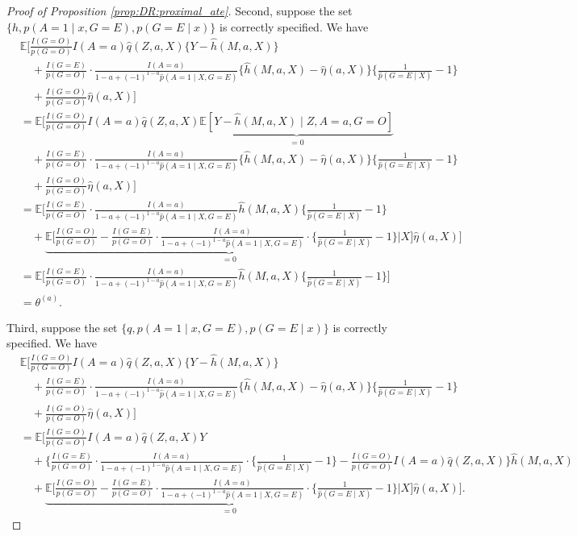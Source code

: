 \documentclass[10pt]{article}
\newcommand{\E}{\mathbb{E}}
\begin{document}
\begin{proof}[Proof of Proposition \ref{prop:DR:proximal_ate}]
Second, suppose the set $\{h,p(A=1\mid x,G=E),p(G=E\mid x)\}$ is correctly specified. We have
\begingroup
\allowdisplaybreaks
{\footnotesize \begin{align*}
&\E\Big[\frac{I(G=O)}{p(G=O)}I(A=a)\hat{q}(Z,a,X)\{Y-\hat{h}(M,a,X)\}\\
&\quad+\frac{I(G=E)}{p(G=O)}\cdot\frac{I(A=a)}{1-a+(-1)^{1-a}\hat{p}(A=1\mid X,G=E)}
\{\hat{h}(M,a,X)-\hat{\eta}(a,X)\}\{\frac{1}{\hat{p}(G=E\mid X)}-1\}\\
&\quad+\frac{I(G=O)}{p(G=O)}\hat{\eta}(a,X)\Big]\\
&=\E\Big[\frac{I(G=O)}{p(G=O)}I(A=a)\hat{q}(Z,a,X)\underbrace{\E[Y-\hat{h}(M,a,X)\mid Z,A=a,G=O]}_{=0}\\
&\quad+\frac{I(G=E)}{p(G=O)}\cdot\frac{I(A=a)}{1-a+(-1)^{1-a}\hat{p}(A=1\mid X,G=E)}
\{\hat{h}(M,a,X)-\hat{\eta}(a,X)\}\{\frac{1}{\hat{p}(G=E\mid X)}-1\}\\
&\quad+\frac{I(G=O)}{p(G=O)}\hat{\eta}(a,X)\Big]\\
&=\E\Big[
\frac{I(G=E)}{p(G=O)}\cdot\frac{I(A=a)}{1-a+(-1)^{1-a}\hat{p}(A=1\mid X,G=E)}
\hat{h}(M,a,X)\{\frac{1}{\hat{p}(G=E\mid X)}-1\}\\
&\quad+\underbrace{\E\big[\frac{I(G=O)}{p(G=O)}-\frac{I(G=E)}{p(G=O)}\cdot\frac{I(A=a)}{1-a+(-1)^{1-a}\hat{p}(A=1\mid X,G=E)}
\cdot\{\frac{1}{\hat{p}(G=E\mid X)}-1\}\big| X\big]}_{=0}\hat{\eta}(a,X)\Big]\\
&=\E\Big[
\frac{I(G=E)}{p(G=O)}\cdot\frac{I(A=a)}{1-a+(-1)^{1-a}\hat{p}(A=1\mid X,G=E)}
\hat{h}(M,a,X)\{\frac{1}{\hat{p}(G=E\mid X)}-1\}\Big]\\
&=\theta^{(a)}.
\end{align*}}
\endgroup

Third, suppose the set $\{q,p(A=1\mid x,G=E),p(G=E\mid x)\}$ is correctly specified. We have
{\footnotesize \begin{align*}
&\E\Big[\frac{I(G=O)}{p(G=O)}I(A=a)\hat{q}(Z,a,X)\{Y-\hat{h}(M,a,X)\}\\
&\quad+\frac{I(G=E)}{p(G=O)}\cdot\frac{I(A=a)}{1-a+(-1)^{1-a}\hat{p}(A=1\mid X,G=E)}
\{\hat{h}(M,a,X)-\hat{\eta}(a,X)\}\{\frac{1}{\hat{p}(G=E\mid X)}-1\}\\
&\quad+\frac{I(G=O)}{p(G=O)}\hat{\eta}(a,X)\Big]\\
&=\E\Big[\frac{I(G=O)}{p(G=O)}I(A=a)\hat{q}(Z,a,X)Y\\
&\quad+\Big\{\frac{I(G=E)}{p(G=O)}\cdot\frac{I(A=a)}{1-a+(-1)^{1-a}\hat{p}(A=1\mid X,G=E)}\cdot\{\frac{1}{\hat{p}(G=E\mid X)}-1\}-\frac{I(G=O)}{p(G=O)}I(A=a)\hat{q}(Z,a,X)\Big\}\hat{h}(M,a,X)\\
&\quad+\underbrace{\E\big[\frac{I(G=O)}{p(G=O)}-\frac{I(G=E)}{p(G=O)}\cdot\frac{I(A=a)}{1-a+(-1)^{1-a}\hat{p}(A=1\mid X,G=E)}
\cdot\{\frac{1}{\hat{p}(G=E\mid X)}-1\}\big| X\big]}_{=0}\hat{\eta}(a,X)\Big].
\end{align*}}


\end{proof}
\end{document}
